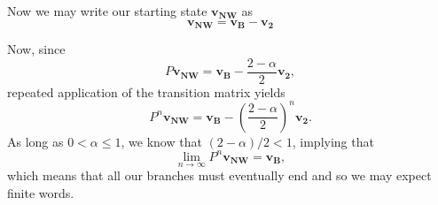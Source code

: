 \documentclass[11pt]{article}
\begin{document}
Now we may write our starting state $\mathbf{v_{NW}}$ as 
\begin{equation}
\mathbf{v_{NW}} = \mathbf{v_B} - \mathbf{v_2}
\end{equation}

Now, since
\begin{equation}
P\mathbf{v_{NW}} = \mathbf{v_B} -  \frac{2-\alpha}{2}\mathbf{v_2},
\end{equation}
repeated application of the transition matrix yields
\begin{equation}
P^n\mathbf{v_{NW}} = \mathbf{v_B} -  \left(\frac{2-\alpha}{2}\right)^n\mathbf{v_2}.
\end{equation}
As long as $0<\alpha\le1$, we know that $(2-\alpha)/2<1$, implying that
\begin{equation}
\lim_{n\to\infty}P^n\mathbf{v_{NW}} = \mathbf{v_B},
\end{equation}
which means that all our branches must eventually end and so we may expect finite words.







\appendix
\end{document}
